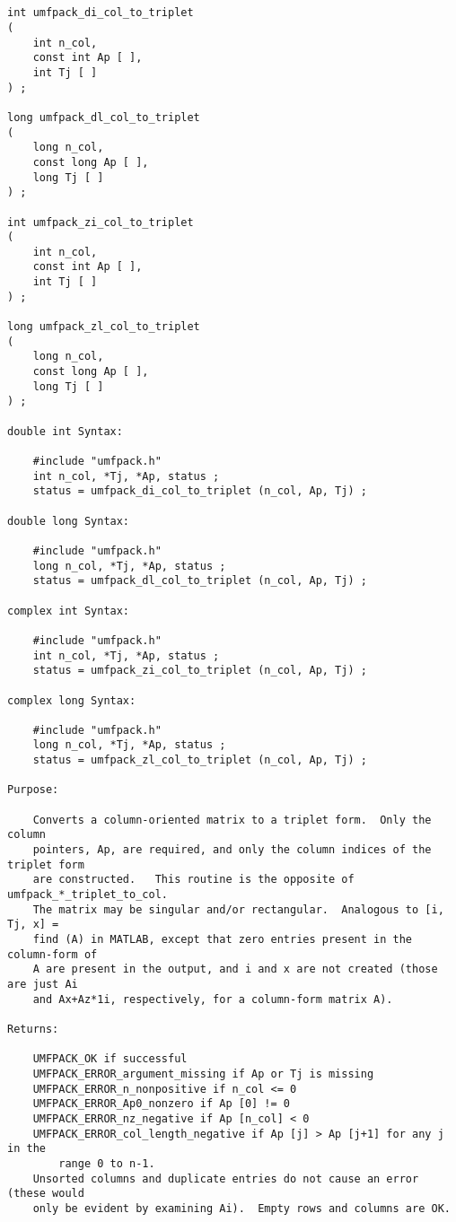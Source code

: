 {\footnotesize
\begin{verbatim}


int umfpack_di_col_to_triplet
(
    int n_col,
    const int Ap [ ],
    int Tj [ ]
) ;

long umfpack_dl_col_to_triplet
(
    long n_col,
    const long Ap [ ],
    long Tj [ ]
) ;

int umfpack_zi_col_to_triplet
(
    int n_col,
    const int Ap [ ],
    int Tj [ ]
) ;

long umfpack_zl_col_to_triplet
(
    long n_col,
    const long Ap [ ],
    long Tj [ ]
) ;

double int Syntax:

    #include "umfpack.h"
    int n_col, *Tj, *Ap, status ;
    status = umfpack_di_col_to_triplet (n_col, Ap, Tj) ;

double long Syntax:

    #include "umfpack.h"
    long n_col, *Tj, *Ap, status ;
    status = umfpack_dl_col_to_triplet (n_col, Ap, Tj) ;

complex int Syntax:

    #include "umfpack.h"
    int n_col, *Tj, *Ap, status ;
    status = umfpack_zi_col_to_triplet (n_col, Ap, Tj) ;

complex long Syntax:

    #include "umfpack.h"
    long n_col, *Tj, *Ap, status ;
    status = umfpack_zl_col_to_triplet (n_col, Ap, Tj) ;

Purpose:

    Converts a column-oriented matrix to a triplet form.  Only the column
    pointers, Ap, are required, and only the column indices of the triplet form
    are constructed.   This routine is the opposite of umfpack_*_triplet_to_col.
    The matrix may be singular and/or rectangular.  Analogous to [i, Tj, x] =
    find (A) in MATLAB, except that zero entries present in the column-form of
    A are present in the output, and i and x are not created (those are just Ai
    and Ax+Az*1i, respectively, for a column-form matrix A).

Returns:

    UMFPACK_OK if successful
    UMFPACK_ERROR_argument_missing if Ap or Tj is missing
    UMFPACK_ERROR_n_nonpositive if n_col <= 0
    UMFPACK_ERROR_Ap0_nonzero if Ap [0] != 0
    UMFPACK_ERROR_nz_negative if Ap [n_col] < 0
    UMFPACK_ERROR_col_length_negative if Ap [j] > Ap [j+1] for any j in the
        range 0 to n-1.
    Unsorted columns and duplicate entries do not cause an error (these would
    only be evident by examining Ai).  Empty rows and columns are OK.


\end{verbatim}}
